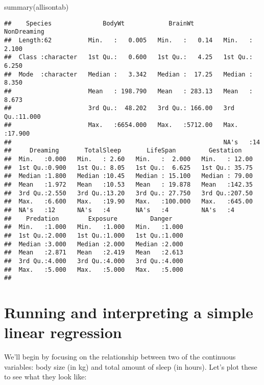 \documentclass[
]{book}
\newenvironment{Shaded}{\begin{snugshade}}{\end{snugshade}}
\newcommand{\FunctionTok}[1]{\textcolor[rgb]{0.00,0.00,0.00}{#1}}
\newcommand{\NormalTok}[1]{#1}
\begin{document}
\begin{Shaded}
\begin{Highlighting}[]
\FunctionTok{summary}\NormalTok{(allisontab)}
\end{Highlighting}
\end{Shaded}

\begin{verbatim}
##    Species              BodyWt            BrainWt         NonDreaming    
##  Length:62          Min.   :   0.005   Min.   :   0.14   Min.   : 2.100  
##  Class :character   1st Qu.:   0.600   1st Qu.:   4.25   1st Qu.: 6.250  
##  Mode  :character   Median :   3.342   Median :  17.25   Median : 8.350  
##                     Mean   : 198.790   Mean   : 283.13   Mean   : 8.673  
##                     3rd Qu.:  48.202   3rd Qu.: 166.00   3rd Qu.:11.000  
##                     Max.   :6654.000   Max.   :5712.00   Max.   :17.900  
##                                                          NA's   :14      
##     Dreaming       TotalSleep       LifeSpan         Gestation     
##  Min.   :0.000   Min.   : 2.60   Min.   :  2.000   Min.   : 12.00  
##  1st Qu.:0.900   1st Qu.: 8.05   1st Qu.:  6.625   1st Qu.: 35.75  
##  Median :1.800   Median :10.45   Median : 15.100   Median : 79.00  
##  Mean   :1.972   Mean   :10.53   Mean   : 19.878   Mean   :142.35  
##  3rd Qu.:2.550   3rd Qu.:13.20   3rd Qu.: 27.750   3rd Qu.:207.50  
##  Max.   :6.600   Max.   :19.90   Max.   :100.000   Max.   :645.00  
##  NA's   :12      NA's   :4       NA's   :4         NA's   :4       
##    Predation        Exposure         Danger     
##  Min.   :1.000   Min.   :1.000   Min.   :1.000  
##  1st Qu.:2.000   1st Qu.:1.000   1st Qu.:1.000  
##  Median :3.000   Median :2.000   Median :2.000  
##  Mean   :2.871   Mean   :2.419   Mean   :2.613  
##  3rd Qu.:4.000   3rd Qu.:4.000   3rd Qu.:4.000  
##  Max.   :5.000   Max.   :5.000   Max.   :5.000  
## 
\end{verbatim}

\hypertarget{running-and-interpreting-a-simple-linear-regression}{%
\section{Running and interpreting a simple linear regression}\label{running-and-interpreting-a-simple-linear-regression}}

We'll begin by focusing on the relationship between two of the continuous variables: body size (in kg) and total amount of sleep (in hours). Let's plot these to see what they look like:
\end{document}
